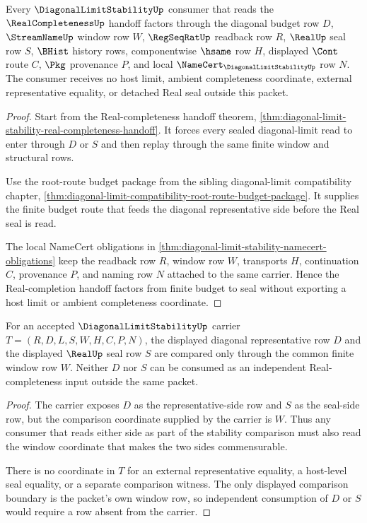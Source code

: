 \begin{theorem}
\label{thm:diagonal-limit-stability-budget-seal-factorization}
Every $\DiagonalLimitStabilityUp$ consumer that reads the $\RealCompletenessUp$ handoff factors through the diagonal budget row $D$, $\StreamNameUp$ window row $W$, $\RegSeqRatUp$ readback row $R$, $\RealUp$ seal row $S$, $\BHist$ history rows, componentwise $\hsame$ row $H$, displayed $\Cont$ route $C$, $\Pkg$ provenance $P$, and local $\NameCert_{\DiagonalLimitStabilityUp}$ row $N$. The consumer receives no host limit, ambient completeness coordinate, external representative equality, or detached Real seal outside this packet.
\end{theorem}
\begin{proof}
Start from the Real-completeness handoff theorem, \autoref{thm:diagonal-limit-stability-real-completeness-handoff}. It forces every sealed diagonal-limit read to enter through $D$ or $S$ and then replay through the same finite window and structural rows.

Use the root-route budget package from the sibling diagonal-limit compatibility chapter, \autoref{thm:diagonal-limit-compatibility-root-route-budget-package}. It supplies the finite budget route that feeds the diagonal representative side before the Real seal is read.

The local NameCert obligations in \autoref{thm:diagonal-limit-stability-namecert-obligations} keep the readback row $R$, window row $W$, transports $H$, continuation $C$, provenance $P$, and naming row $N$ attached to the same carrier. Hence the Real-completion handoff factors from finite budget to seal without exporting a host limit or ambient completeness coordinate.
\end{proof}

\begin{theorem}
\label{thm:diagonal-limit-stability-representative-seal-comparison}
For an accepted $\DiagonalLimitStabilityUp$ carrier $T=(R,D,L,S,W,H,C,P,N)$, the displayed diagonal representative row $D$ and the displayed $\RealUp$ seal row $S$ are compared only through the common finite window row $W$. Neither $D$ nor $S$ can be consumed as an independent Real-completeness input outside the same packet.
\end{theorem}
\begin{proof}
The carrier exposes $D$ as the representative-side row and $S$ as the seal-side row, but the comparison coordinate supplied by the carrier is $W$. Thus any consumer that reads either side as part of the stability comparison must also read the window coordinate that makes the two sides commensurable.

There is no coordinate in $T$ for an external representative equality, a host-level seal equality, or a separate comparison witness. The only displayed comparison boundary is the packet's own window row, so independent consumption of $D$ or $S$ would require a row absent from the carrier.
\end{proof}

